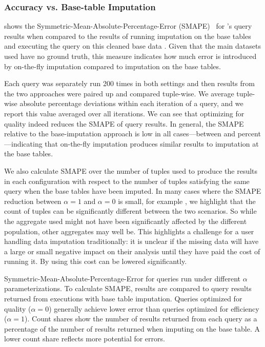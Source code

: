 \subsubsection{Accuracy vs. Base-table Imputation}

 shows the Symmetric-Mean-Absolute-Percentage-Error (SMAPE)~\cite{Makridakis2000451} for
\ProjectName{}'s query results when compared to the results of running imputation on the base tables and
executing the query on this cleaned base data \cite{tofallis2015better}. Given that the main datasets used
have no ground truth, this measure indicates how much error is introduced by on-the-fly imputation compared
to imputation on the base tables.

Each query was separately run 200 times in both settings and then results from the two approaches were
paired up and compared tuple-wise.  We average tuple-wise absolute percentage deviations
within each iteration of a query, and we report this value averaged over all iterations.  We
can see that optimizing for quality indeed reduces the SMAPE of query results.  In general, the SMAPE relative 
to the base-imputation approach is low in all cases---between
\lowsmapealphazero{} and \highsmapealphaoneexacs{} percent---indicating that on-the-fly
imputation produces similar results to imputation at the base tables.

We also calculate SMAPE over the number of tuples used to produce the results
in each configuration with respect to the number of tuples satisfying the same query when
the base tables have been imputed. In many cases where the SMAPE reduction between $\alpha = 1$ and
$\alpha = 0$ is small, for example , we highlight that the count of tuples can be significantly different between
the two scenarios. So while the aggregate used might not have been significantly affected by the different population,
other aggregates may well be. This highlights a challenge for a user handling data imputation traditionally: it is unclear if
the missing data will have a large or small negative impact on their analysis until they have paid the cost of
running it. By using \ProjectName{} this cost can be lowered significantly.


\begin{table}
\centering

\caption{Symmetric-Mean-Absolute-Percentage-Error for queries run under different $\alpha$
    parameterizations. To calculate SMAPE, \ProjectName{} results are compared to query results returned
    from executions with base table imputation. Queries optimized
    for quality ($\alpha=0$) generally achieve lower error than queries optimized for
    efficiency ($\alpha=1$). Count shares show the number of results returned from each
    query as a percentage of the number of results returned when imputing on the base table.
    A lower count share reflects more potential for errors.}
\label{table:smape}
\end{table}


